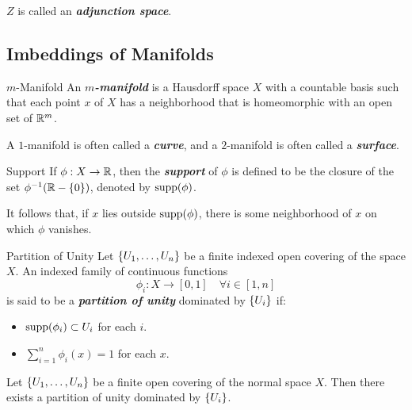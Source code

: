 \documentclass[12pt,a4paper]{article}
\begin{document}
    \begin{remark}
        $Z$ is called an \textbf{\textit{adjunction space}}.
    \end{remark}
    \hfill

    \subsection{Imbeddings of Manifolds}
    \begin{defi}{$m$-Manifold}
        An \textbf{\textit{$m$-manifold}} is a Hausdorff space $X$ with a countable basis such that each point $x$ of $X$ has a neighborhood that is homeomorphic with an open set of $\mathbb{R}^m$.
    \end{defi}
    \begin{remark}
        A $1$-manifold is often called a \textit{\textbf{curve}}, and a $2$-manifold is often called a \textbf{\textit{surface}}.
    \end{remark}
    \hfill

    \begin{defi}{Support}\addelement{$\supp$}
        If $\phi:X\to\mathbb{R}$, then the \textbf{\textit{support}} of $\phi$ is defined to be the closure of the set $\phi^{-1}(\mathbb{R}-\left\{0\right\})$, denoted by $\operatorname{supp}(\phi)$.
    \end{defi}
    \begin{remark}
        It follows that, if $x$ lies outside $\operatorname{supp}(\phi)$, there is some neighborhood of $x$ on which $\phi$ vanishes.
    \end{remark}
    \hfill

    \begin{defi}{Partition of Unity}
        Let $\left\{U_1,\dots,U_n\right\}$ be a finite indexed open covering of the space $X$. An indexed family of continuous functions
        $$
        \phi_i:X\to[0,1]\quad\forall i\in[1,n]
        $$
        is said to be a \textbf{\textit{partition of unity}} dominated by $\left\{U_i\right\}$ if:
        \begin{itemize}
            \item $\operatorname{supp}(\phi_i)\subset U_i$ for each $i$.
            \item $\sum_{i=1}^n\phi_i(x)=1$ for each $x$.
        \end{itemize}
    \end{defi}
    \hfill

    \begin{thm}
        Let $\left\{U_1,\dots,U_n\right\}$ be a finite open covering of the normal space $X$. Then there exists a partition of unity dominated by $\left\{U_i\right\}$.
    \end{thm}
    \hfill
\end{document}
